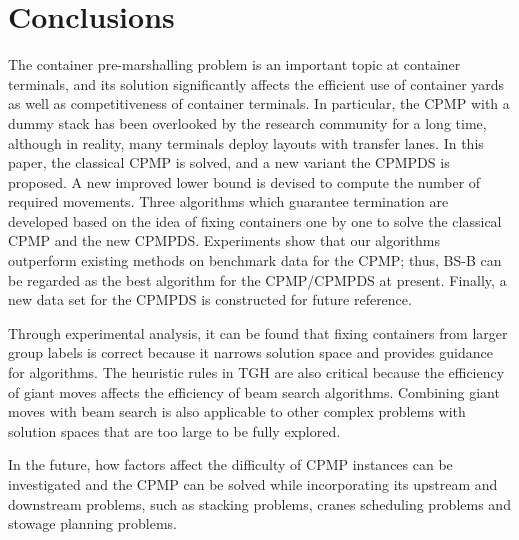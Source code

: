 \documentclass[review,3p,times,authoryear,12pt]{elsarticle}
\begin{document}
\section{Conclusions}
\label{sec:con}

The container pre-marshalling problem is an important topic at container terminals, and its solution significantly affects the efficient use of container yards as well as competitiveness of container terminals. 
In particular, the CPMP with a dummy stack has been overlooked by the research community for a long time, although in reality, many terminals deploy layouts with transfer lanes.
In this paper, the classical CPMP is solved, and a new variant the CPMPDS is proposed. 
A new improved lower bound is devised to compute the number of required movements. 
Three algorithms which guarantee termination are developed based on the idea of fixing containers one by one to solve the classical CPMP and the new CPMPDS. 
Experiments show that our algorithms outperform existing methods on benchmark data for the CPMP; thus, BS-B can be regarded as the best algorithm for the CPMP/CPMPDS at present.
Finally, a new data set for the CPMPDS is constructed for future reference.

Through experimental analysis, it can be found that fixing containers from larger group labels is correct because it narrows solution space and provides guidance for algorithms. 
The heuristic rules in TGH are also critical because the efficiency of giant moves affects the efficiency of beam search algorithms. 
Combining giant moves with beam search is also applicable to other complex problems with solution spaces that are too large to be fully explored.

In the future, how factors affect the difficulty of CPMP instances can be investigated and the CPMP can be solved while incorporating its upstream and downstream problems, such as stacking problems, cranes scheduling problems and stowage planning problems.






\end{document}
